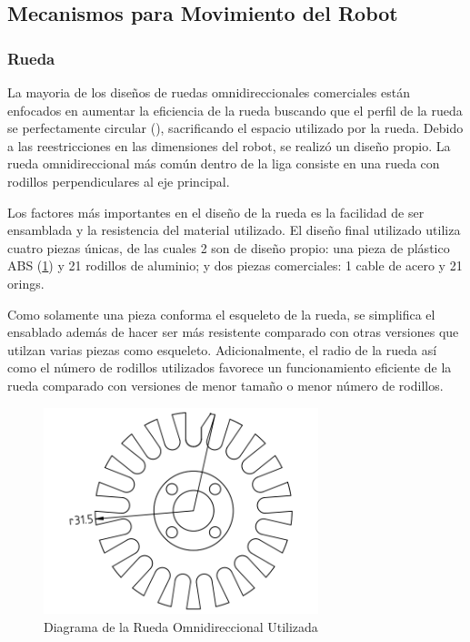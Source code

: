 \documentclass[twocolumn,10pt]{amrob}
\begin{document}
\subsection*{Mecanismos para Movimiento del Robot}

\subsubsection*{Rueda}
La mayoria de los diseños de ruedas omnidireccionales comerciales están enfocados en aumentar la eficiencia de la rueda buscando que el perfil de la rueda se perfectamente circular (\cite{rojas2005short}), sacrificando el espacio utilizado por la rueda. Debido a las reestricciones en las dimensiones del robot, se realizó un diseño propio. La rueda omnidireccional más común dentro de la liga consiste en una rueda con rodillos perpendiculares al eje principal. \par

Los factores más importantes en el diseño de la rueda es la facilidad de ser ensamblada y la resistencia del material utilizado. El diseño final utilizado utiliza cuatro piezas únicas, de las cuales 2 son de diseño propio: una pieza de plástico ABS (\ref{fig:ruedaOmni}) y 21 rodillos de aluminio; y dos piezas comerciales: 1 cable de acero y 21 orings. \par

Como solamente una pieza conforma el esqueleto de la rueda, se simplifica el ensablado además de hacer ser más resistente comparado con otras versiones que utilzan varias piezas como esqueleto. Adicionalmente, el radio de la rueda así como el número de rodillos utilizados favorece un funcionamiento eficiente de la rueda comparado con versiones de menor tamaño o menor número de rodillos.\par

\begin{figure}[t]
  \centering
    \includegraphics[width=8cm]{rueda.png}
  \caption{Diagrama de la Rueda Omnidireccional Utilizada}
  \label{fig:ruedaOmni}
\end{figure}
\end{document}
